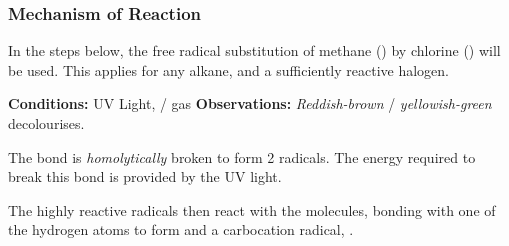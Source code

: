 		\subsubsection{Mechanism of Reaction}

			In the steps below, the free radical substitution of methane () by chlorine () will be used. This applies
			for any alkane, and a sufficiently reactive halogen.

			\vspace{1.5em}

			\vbox{\textbf{Conditions:} \tabto{35mm}UV Light,  /  gas}	%
			\vbox{\textbf{Observations:} \tabto{35mm}\textit{\color{Mahogany}Reddish-brown}  / \textit{\color{YellowGreen}yellowish-green}  decolourises.}


				The \ch{\chlorine-\chlorine} bond is \textit{homolytically} broken to form 2 \ch{\chlorine} radicals.
				The energy required to break this bond is provided by the UV light.




				The highly reactive \ch{\chlorine} radicals then react with the  molecules, bonding with one of the
				hydrogen atoms to form  and a carbocation radical, .


